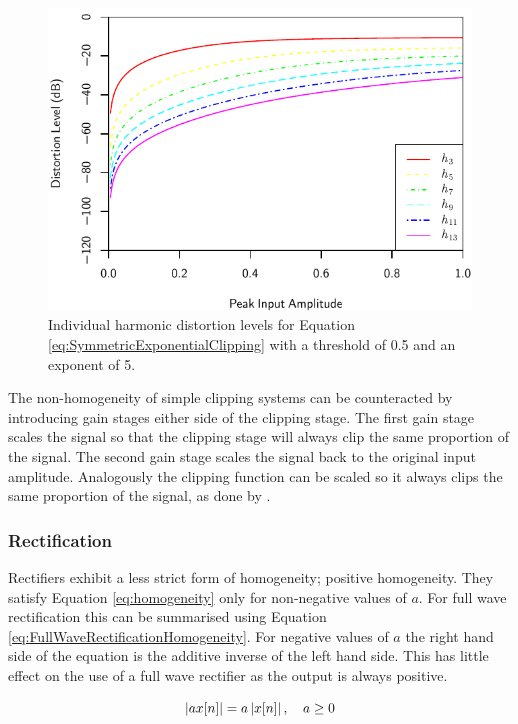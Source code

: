 			\begin{figure}[h!]
				\centering
				\includegraphics{chapter5/Images/ExponentialClippingHarmonics.pdf}
				\caption{Individual harmonic distortion levels for Equation
					 \ref{eq:SymmetricExponentialClipping} with a threshold of 0.5 and an 
				         exponent of 5.}
				\label{fig:ExponentialClippingHarmonics}
			\end{figure}

			The non-homogeneity of simple clipping systems can be counteracted by introducing gain stages
			either side of the clipping stage. The first gain stage scales the signal so that the clipping
			stage will always clip the same proportion of the signal. The second gain stage scales the signal
			back to the original input amplitude. Analogously the clipping function can be scaled so it
			always clips the same proportion of the signal, as done by \citet{deman2014adaptive}.

		\subsubsection*{Rectification}
			Rectifiers exhibit a less strict form of homogeneity; positive homogeneity. They satisfy Equation
			\ref{eq:homogeneity} only for non-negative values of $a$. For full wave rectification this can be
			summarised using Equation \ref{eq:FullWaveRectificationHomogeneity}. For negative values of $a$ the
			right hand side of the equation is the additive inverse of the left hand side. This has little
			effect on the use of a full wave rectifier as the output is always positive.

			\begin{equation}
				\left|ax[n]\right| = a\left|x[n]\right|, \quad a \geq 0
				\label{eq:FullWaveRectificationHomogeneity}
			\end{equation}

